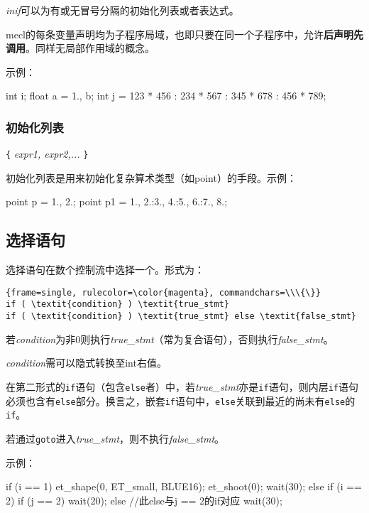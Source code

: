 \documentclass{article}
\begin{document}
\textit{inif}可以为有或无冒号分隔的初始化列表或者表达式。

mecl的每条变量声明均为子程序局域，也即只要在同一个子程序中，允许\textbf{后声明先调用}。同样无局部作用域的概念。

示例：

\begin{MUAvbt}
int i;
float a = 1., b;
int j = 123 * 456 : 234 * 567 : 345 * 678 : 456 * 789;
\end{MUAvbt}

\subsubsection{初始化列表}

\verb|{| \textit{expr1, expr2,...} \verb|}|

初始化列表是用来初始化复杂算术类型（如point）的手段。示例：

\begin{MUAvbt}
point p = {1., 2.};
point p1 = {1., 2.}:{3., 4.}:{5., 6.}:{7., 8.};
\end{MUAvbt}

\subsection{选择语句}

选择语句在数个控制流中选择一个。形式为：

\begin{Verbatim}{frame=single, rulecolor=\color{magenta}, commandchars=\\\{\}}
if ( \textit{condition} ) \textit{true_stmt}
if ( \textit{condition} ) \textit{true_stmt} else \textit{false_stmt}
\end{Verbatim}

若\textit{condition}为非0则执行\textit{true_stmt}（常为复合语句），否则执行\textit{false_stmt}。

\textit{condition}需可以隐式转换至int右值。

在第二形式的\verb|if|语句（包含\verb|else|者）中，若\textit{true_stmt}亦是\verb|if|语句，则内层\verb|if|语句必须也含有\verb|else|部分。换言之，嵌套\verb|if|语句中，\verb|else|关联到最近的尚未有\verb|else|的\verb|if|。

若通过\verb|goto|进入\textit{true_stmt}，则不执行\textit{false_stmt}。

示例：

\begin{MUAvbt}
if (i == 1) {
	et_shape(0, ET_small, BLUE16);
	et_shoot(0);
	wait(30);
}
else if (i == 2)
	if (j == 2)
		wait(20);
	else			//此else与j == 2的if对应
		wait(30);
\end{MUAvbt}
\end{document}
